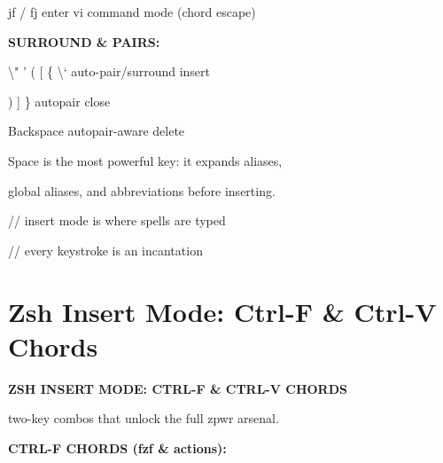 \documentclass[11pt,a4paper,twoside]{book}
\begin{document}
jf / fj              enter vi command mode (chord escape)


\vspace{12pt}
{\bfseries\color{neonyellow} SURROUND \& PAIRS:}\vspace{4pt}

\textbackslash{}" ' ( [ \{ \textbackslash{}`          auto-pair/surround insert

) ] \}                 autopair close

Backspace             autopair-aware delete

Space is the most powerful key: it expands aliases,

global aliases, and abbreviations before inserting.

// insert mode is where spells are typed

// every keystroke is an incantation


\vspace{16pt}

\section{Zsh Insert Mode: Ctrl-F \& Ctrl-V Chords}


\vspace{10pt}
{\large\bfseries\color{neoncyan} ZSH INSERT MODE: CTRL-F \& CTRL-V CHORDS}\vspace{6pt}

two-key combos that unlock the full zpwr arsenal.


\vspace{12pt}
{\bfseries\color{neonyellow} CTRL-F CHORDS (fzf \& actions):}\vspace{4pt}
\end{document}
